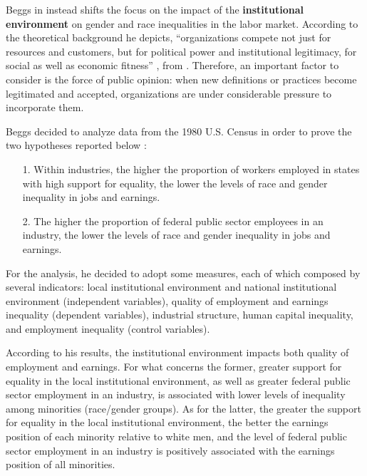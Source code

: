Beggs in \cite{beggs1995institutional} instead shifts the focus on the impact of the \textbf{institutional environment} on gender and race inequalities in the labor market. According to the theoretical background he depicts, ``organizations compete not just for resources and customers, but for political power and institutional legitimacy, for social as well as economic fitness'' \cite[p.~613]{beggs1995institutional}, from \cite[p.~150]{dimaggio1983iron}. Therefore, an important factor to consider is the force of public opinion: when new definitions or practices become legitimated and accepted, organizations are under considerable pressure to incorporate them.

Beggs decided to analyze data from the 1980 U.S. Census in order to prove the two hypotheses reported below \cite{beggs1995institutional}:
\begin{itemize}
\item[1.] Within industries, the higher the proportion of workers employed in states with high support for equality, the lower the levels of race and gender inequality in jobs and earnings.
\item[2.] The higher the proportion of federal public sector employees in an industry, the lower the levels of race and gender inequality in jobs and earnings.
\end{itemize}

For the analysis, he decided to adopt some measures, each of which composed by several indicators: local institutional environment and national institutional environment (independent variables), quality of employment and earnings inequality (dependent variables), industrial structure, human capital inequality, and employment inequality (control variables).

According to his results, the institutional environment impacts both quality of employment and earnings. For what concerns the former, greater support for equality in the local institutional environment, as well as greater federal public sector employment in an industry, is associated with lower levels of inequality among minorities (race/gender groups). As for the latter, the greater the support for equality in the local institutional environment, the better the earnings position of each minority relative to white men, and the level of federal public sector employment in an industry is positively associated with the earnings position of all minorities.

